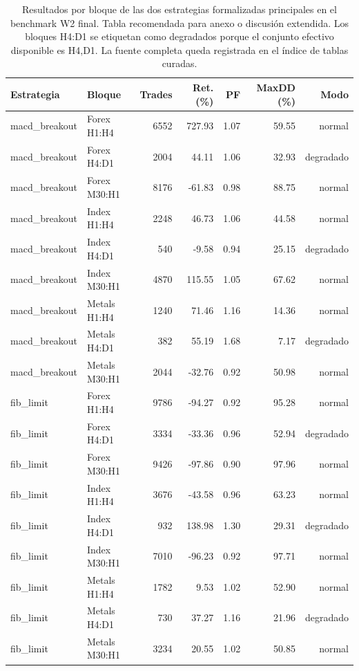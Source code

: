 \begin{table}[H]
\centering
\scriptsize
\begin{tabular}{llrrrrr}
\hline
Estrategia & Bloque & Trades & Ret. (\%) & PF & MaxDD (\%) & Modo \\
\hline
macd\_breakout & Forex H1:H4 & 6552 & 727.93 & 1.07 & 59.55 & normal \\
macd\_breakout & Forex H4:D1 & 2004 & 44.11 & 1.06 & 32.93 & degradado \\
macd\_breakout & Forex M30:H1 & 8176 & -61.83 & 0.98 & 88.75 & normal \\
macd\_breakout & Index H1:H4 & 2248 & 46.73 & 1.06 & 44.58 & normal \\
macd\_breakout & Index H4:D1 & 540 & -9.58 & 0.94 & 25.15 & degradado \\
macd\_breakout & Index M30:H1 & 4870 & 115.55 & 1.05 & 67.62 & normal \\
macd\_breakout & Metals H1:H4 & 1240 & 71.46 & 1.16 & 14.36 & normal \\
macd\_breakout & Metals H4:D1 & 382 & 55.19 & 1.68 & 7.17 & degradado \\
macd\_breakout & Metals M30:H1 & 2044 & -32.76 & 0.92 & 50.98 & normal \\
fib\_limit & Forex H1:H4 & 9786 & -94.27 & 0.92 & 95.28 & normal \\
fib\_limit & Forex H4:D1 & 3334 & -33.36 & 0.96 & 52.94 & degradado \\
fib\_limit & Forex M30:H1 & 9426 & -97.86 & 0.90 & 97.96 & normal \\
fib\_limit & Index H1:H4 & 3676 & -43.58 & 0.96 & 63.23 & normal \\
fib\_limit & Index H4:D1 & 932 & 138.98 & 1.30 & 29.31 & degradado \\
fib\_limit & Index M30:H1 & 7010 & -96.23 & 0.92 & 97.71 & normal \\
fib\_limit & Metals H1:H4 & 1782 & 9.53 & 1.02 & 52.90 & normal \\
fib\_limit & Metals H4:D1 & 730 & 37.27 & 1.16 & 21.96 & degradado \\
fib\_limit & Metals M30:H1 & 3234 & 20.55 & 1.02 & 50.85 & normal \\
\hline
\end{tabular}
\caption{Resultados por bloque de las dos estrategias formalizadas principales en el benchmark W2 final. Tabla recomendada para anexo o discusi\'on extendida. Los bloques H4:D1 se etiquetan como degradados porque el conjunto efectivo disponible es H4,D1. La fuente completa queda registrada en el \'indice de tablas curadas.}
\label{tab:benchmarks-w2-bloques-seleccionados}
\end{table}
